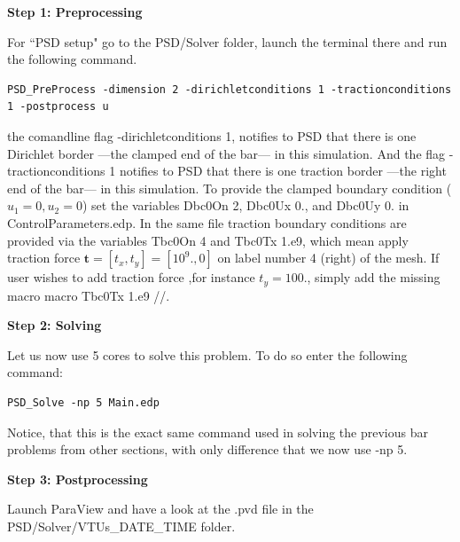 \textbf{Step 1: Preprocessing}

For ``PSD setup" go to the {\ttfamily PSD/Solver} folder, launch the terminal there and run the following command.
\begin{lstlisting}[style=Linux]
PSD_PreProcess -dimension 2 -dirichletconditions 1 -tractionconditions 1 -postprocess u
\end{lstlisting}
%
the comandline flag {\ttfamily -dirichletconditions 1}, notifies to PSD that there is one Dirichlet border ---the clamped end of the bar--- in this simulation. And the flag {\ttfamily -tractionconditions 1} notifies to PSD that there is one traction border ---the right end of the bar--- in this simulation. 
To provide the clamped boundary condition ($u_1=0,u_2=0$) set the variables  {\ttfamily Dbc0On 2}, {\ttfamily Dbc0Ux 0.}, and {\ttfamily Dbc0Uy 0.} in {\ttfamily ControlParameters.edp}. In the same file traction boundary conditions are provided via the variables {\ttfamily Tbc0On 4} and {\ttfamily Tbc0Tx 1.e9}, which mean apply traction force $\mathbf t=[t_x,t_y]=[10^9.,0]$ on label number 4 (right) of the mesh. If user wishes to add traction force ,for instance $t_y=100.$, simply add the missing macro {\ttfamily macro Tbc0Tx 1.e9 //}.


\textbf{Step 2: Solving}

Let us now use 5 cores to solve this problem. To do so enter the following command:

\begin{lstlisting}[style=Linux]
PSD_Solve -np 5 Main.edp
\end{lstlisting}
%
Notice, that this is the exact same command used in solving the previous bar problems from other sections, with only difference that we now use {\ttfamily -np 5}.


\textbf{Step 3: Postprocessing}

Launch ParaView and have a look at the  {\ttfamily .pvd} file in the  {\ttfamily PSD/Solver/VTUs\_DATE\_TIME} folder. 


